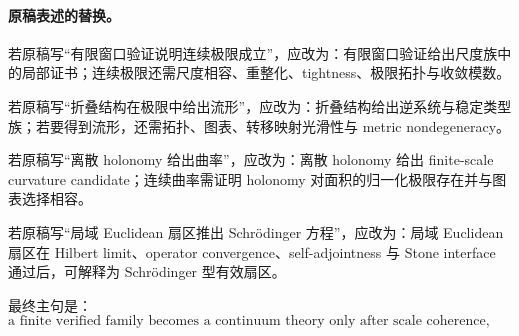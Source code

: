 \paragraph{原稿表述的替换。}
若原稿写“有限窗口验证说明连续极限成立”，应改为：有限窗口验证给出尺度族中的局部证书；连续极限还需尺度相容、重整化、tightness、极限拓扑与收敛模数。

若原稿写“折叠结构在极限中给出流形”，应改为：折叠结构给出逆系统与稳定类型族；若要得到流形，还需拓扑、图表、转移映射光滑性与 metric nondegeneracy。

若原稿写“离散 holonomy 给出曲率”，应改为：离散 holonomy 给出 finite-scale curvature candidate；连续曲率需证明 holonomy 对面积的归一化极限存在并与图表选择相容。

若原稿写“局域 Euclidean 扇区推出 Schrödinger 方程”，应改为：局域 Euclidean 扇区在 Hilbert limit、operator convergence、self-adjointness 与 Stone interface 通过后，可解释为 Schrödinger 型有效扇区。

最终主句是：
\[
\boxed{
\text{a finite verified family becomes a continuum theory only after scale coherence, renormalization, tightness, limit topology, convergence modulus, boundary-layer control, and structure certificates pass.}
}
\]
